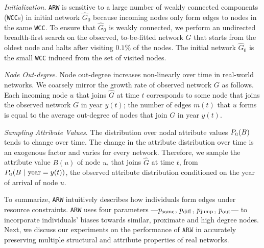\textit{Initialization}. \texttt{ARW} is
sensitive to a large number of weakly connected components (\texttt{WCC}s) in
initial network $\hat{G}_0$ because incoming nodes only form edges to nodes
in the same \texttt{WCC}. To ensure that $\hat{G}_0$ is weakly
connected, we perform an undirected breadth-first search on the observed,
to-be-fitted network $G$ that starts from the oldest node and halts after
visiting $0.1\%$ of the nodes. The initial network $\hat{G}_0$ is the small \texttt{WCC}
induced from the set of visited nodes.


\textit{Node Out-degree}.
Node out-degree increases non-linearly over time in real-world networks.
We coarsely mirror the growth rate of observed network $G$ as follows.
Each incoming node $u$ that joins $\hat{G}$ at time $t$ corresponds to some
node that joins the observed network $G$ in year $y(t)$; the number of edges $m(t)$
that $u$ forms is equal to the average out-degree of nodes that join $G$ in year $y(t)$.

\textit{Sampling Attribute Values}.
The distribution over nodal attribute values $P_{\textsc{g}}(B)$ tends to change over time.
The change in the attribute distribution over time is an exogenous factor and varies for every network.
Therefore, we sample the attribute value $B(u)$ of node $u$, that joins $\hat{G}$ at time
$t$, from $P_{\textsc{g}}(B{\mbox{ | year}=y(t)})$, the observed attribute
distribution conditioned on the year of arrival of node $u$.

To summarize, \texttt{ARW}
intuitively describes how individuals form edges under resource constraints.
\texttt{ARW} uses four parameters ---$p_{\scriptsize\mbox{same}}$, $p_{\scriptsize\mbox{diff}}$, $p_{\scriptsize\mbox{jump}}$, $p_{\scriptsize\mbox{out}}$--- to incorporate
individuals' biases towards similar, proximate and high degree nodes.
Next, we discuss our experiments on the performance of $\texttt{ARW}$
in accurately preserving {multiple} structural and attribute properties of real networks.

